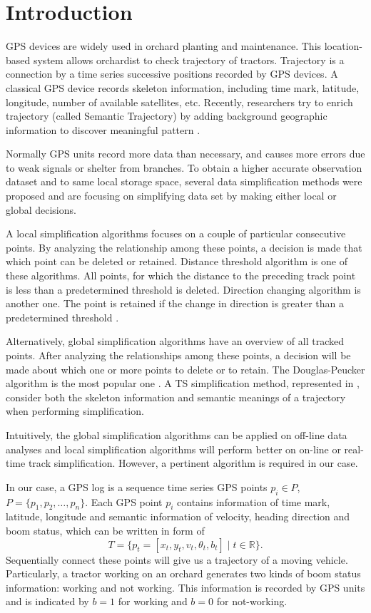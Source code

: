 
\section{Introduction}

GPS devices are widely used in orchard planting and maintenance. This location-based system allows orchardist to check trajectory of tractors. Trajectory is a connection by a time series successive positions recorded by GPS devices. A classical GPS device records skeleton information, including time mark, latitude, longitude, number of available satellites, etc. Recently, researchers try to enrich trajectory (called Semantic Trajectory) by adding background geographic information to discover meaningful pattern \cite{ying2011semantic}. 


Normally GPS units record more data than necessary, and causes more errors due to weak signals or shelter from branches. To obtain a higher accurate observation dataset and to same local storage space, several data simplification methods were proposed and are focusing on simplifying data set by making either local or global decisions. 

A local simplification algorithms focuses on a couple of particular consecutive points. By analyzing the relationship among these points, a decision is made that which point can be deleted or retained. Distance threshold algorithm is one of these algorithms. All points, for which the distance to the preceding track point is less than a predetermined threshold is deleted. Direction changing algorithm is another one. The point is retained if the change in direction is greater than a predetermined threshold  \cite{ivanov2012real}. 

Alternatively, global simplification algorithms have an overview of all tracked points. After analyzing the relationships among these points, a decision will be made about which one or more points to delete or to retain. The Douglas-Peucker algorithm is the most popular one  \cite{douglas1973algorithms}. A TS simplification method, represented in \cite{chen2009trajectory}, consider both the skeleton information and semantic meanings of a trajectory when performing simplification. 


Intuitively, the global simplification algorithms can be applied on off-line data analyses and local simplification algorithms will perform better on on-line or real-time track simplification. However, a pertinent algorithm is required in our case. 


In our case, a GPS log is a sequence time series GPS points $p_i \in P$, $P=\{ p_1,p_2, \ldots, p_n \}$. Each GPS point $p_i$ contains information of time mark, latitude, longitude and semantic information of velocity, heading direction and boom status, which can be written in form of
\begin{equation}
T=\{p_t=[x_t,y_t,v_t,\theta_t,b_t] \mid t \in \mathbb{R} \}.
\end{equation}
Sequentially connect these points will give us a trajectory of a moving vehicle.
Particularly, a tractor working on an orchard generates two kinds of boom status information: working and not working. This information is recorded by GPS units and is indicated by $b=1$ for working and $b=0$ for not-working.


